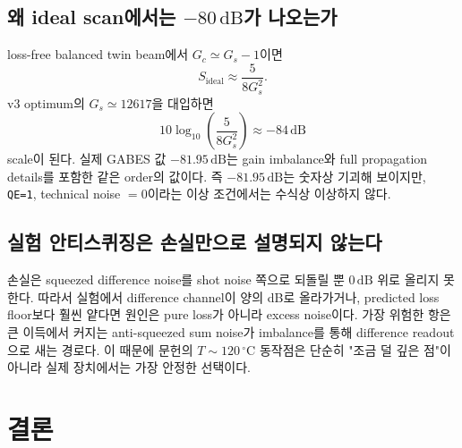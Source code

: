 \documentclass[11pt,a4paper]{article}
\newcommand{\dB}{\,\mathrm{dB}}
\newcommand{\degC}{\,^{\circ}\mathrm{C}}
\begin{document}
\subsection{왜 ideal scan에서는 $-80\dB$가 나오는가}
loss-free balanced twin beam에서 $G_c\simeq G_s-1$이면
\begin{equation}
S_{\mathrm{ideal}}\approx\frac{5}{8G_s^2}.
\end{equation}
v3 optimum의 $G_s\simeq12617$을 대입하면
\begin{equation}
10\log_{10}\left(\frac{5}{8G_s^2}\right)\approx -84\dB
\end{equation}
scale이 된다. 실제 GABES 값 $-81.95\dB$는 gain imbalance와 full propagation details를
포함한 같은 order의 값이다. 즉 $-81.95\dB$는 숫자상 기괴해 보이지만, \texttt{QE=1},
technical noise $=0$이라는 이상 조건에서는 수식상 이상하지 않다.

\subsection{실험 안티스퀴징은 손실만으로 설명되지 않는다}
손실은 squeezed difference noise를 shot noise 쪽으로 되돌릴 뿐 $0\dB$ 위로 올리지 못한다.
따라서 실험에서 difference channel이 양의 dB로 올라가거나, predicted loss floor보다 훨씬
얕다면 원인은 pure loss가 아니라 excess noise이다. 가장 위험한 항은 큰 이득에서 커지는
anti-squeezed sum noise가 imbalance를 통해 difference readout으로 새는 경로다. 이 때문에
문헌의 $T\sim120\degC$ 동작점은 단순히 "조금 덜 깊은 점"이 아니라 실제 장치에서는
가장 안정한 선택이다.

\section{결론}
\end{document}

